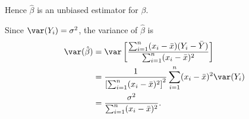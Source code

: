 Hence $\hat{\beta}$ is an unbiased estimator for $\beta$.



%
%



Since $\var(Y_i)=\sigma^2$, the variance of $\hat{\beta}$ is
\begin{align*}
\var(\hat{\beta})
	& = \var\left[\frac{\sum_{i=1}^n (x_i-\bar{x})(Y_i-\bar{Y})}{\sum_{i=1}^n (x_i-\bar{x})^2}\right] \\
	& = \frac{1}{\left[\sum_{i=1}^n(x_i-\bar{x})^2\right]^2}\sum_{i=1}^n(x_i-\bar{x})^2\var(Y_i) \\
	& = \frac{\sigma^2}{\sum_{i=1}^n(x_i-\bar{x})^2}.
\end{align*}


